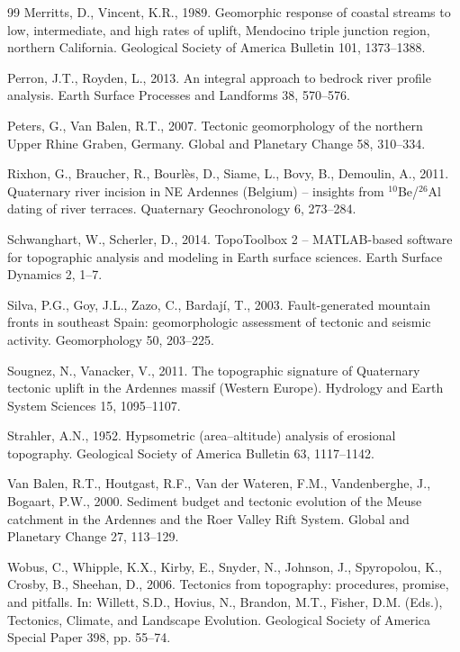 \documentclass[10pt,a4paper,twocolumn]{article}
\begin{document}
\begin{thebibliography}{99}
Merritts, D., Vincent, K.R., 1989. Geomorphic response of coastal streams to low, intermediate, and
high rates of uplift, Mendocino triple junction region, northern California. Geological Society of
America Bulletin 101, 1373--1388.

Perron, J.T., Royden, L., 2013. An integral approach to bedrock river profile analysis. Earth Surface
Processes and Landforms 38, 570--576.

Peters, G., Van Balen, R.T., 2007. Tectonic geomorphology of the northern Upper Rhine Graben, Germany.
Global and Planetary Change 58, 310--334.

Rixhon, G., Braucher, R., Bourlès, D., Siame, L., Bovy, B., Demoulin, A., 2011. Quaternary river
incision in NE Ardennes (Belgium) -- insights from $^{10}$Be/$^{26}$Al dating of river terraces.
Quaternary Geochronology 6, 273--284.

Schwanghart, W., Scherler, D., 2014. TopoToolbox 2 -- MATLAB-based software for topographic analysis
and modeling in Earth surface sciences. Earth Surface Dynamics 2, 1--7.

Silva, P.G., Goy, J.L., Zazo, C., Bardají, T., 2003. Fault-generated mountain fronts in southeast
Spain: geomorphologic assessment of tectonic and seismic activity. Geomorphology 50, 203--225.

Sougnez, N., Vanacker, V., 2011. The topographic signature of Quaternary tectonic uplift in the
Ardennes massif (Western Europe). Hydrology and Earth System Sciences 15, 1095--1107.

Strahler, A.N., 1952. Hypsometric (area--altitude) analysis of erosional topography. Geological
Society of America Bulletin 63, 1117--1142.

Van Balen, R.T., Houtgast, R.F., Van der Wateren, F.M., Vandenberghe, J., Bogaart, P.W., 2000.
Sediment budget and tectonic evolution of the Meuse catchment in the Ardennes and the Roer Valley Rift
System. Global and Planetary Change 27, 113--129.

Wobus, C., Whipple, K.X., Kirby, E., Snyder, N., Johnson, J., Spyropolou, K., Crosby, B., Sheehan, D.,
2006. Tectonics from topography: procedures, promise, and pitfalls. In: Willett, S.D., Hovius, N.,
Brandon, M.T., Fisher, D.M. (Eds.), Tectonics, Climate, and Landscape Evolution. Geological Society of
America Special Paper 398, pp. 55--74.

\end{thebibliography}
\end{document}
